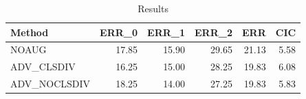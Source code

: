 \begin{table}
\caption{Results}
\label{tab:Results}
\begin{tabular}{lrrrrr}
\toprule
Method & ERR\_0 & ERR\_1 & ERR\_2 & ERR & CIC \\
\midrule
NOAUG & 17.85 & 15.90 & 29.65 & 21.13 & 5.58 \\
ADV\_CLSDIV & 16.25 & 15.00 & 28.25 & 19.83 & 6.08 \\
ADV\_NOCLSDIV & 18.25 & 14.00 & 27.25 & 19.83 & 5.83 \\
\bottomrule
\end{tabular}
\end{table}
